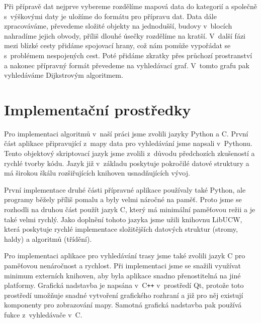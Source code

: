 Při přípravě dat nejprve vybereme rozdělíme mapová data do kategorií a společně
s~výškovými daty je uložíme do formátu pro přípravu dat. Data dále zpracováváme,
převedeme složité objekty na jednodušší, budovy v~blocích nahradíme jejich
obvody, příliš dlouhé úsečky rozdělíme na kratší. V~další fázi mezi blízké cesty
přidáme spojovací hrany, což nám pomůže vypořádat se s~problémem nespojených
cest. Poté přidáme zkratky přes průchozí prostranství a nakonec přípravný formát
převedeme na vyhledávací graf. V~tomto grafu pak vyhledáváme Dijkstrovým
algoritmem.

%

\section{Implementační prostředky}
Pro implementaci algoritmů v~naší práci jsme zvolili jazyky Python a C. První část
aplikace připravující z~mapy data pro vyhledávání jsme napsali v~Pythonu. Tento
objektový skriptovací jazyk jsme zvolili z~důvodu předchozích zkušeností a
rychlé tvorby kódu. Jazyk již v~základu poskytuje pokročilé datové struktury a
má širokou škálu rozšiřujících knihoven usnadňujících vývoj. 

První implementace druhé části přípravné aplikace používaly také Python, ale programy
běžely příliš pomalu a byly velmi náročné na paměť. Proto jsme se rozhodli na
druhou část použít jazyk C, který má minimální paměťovou režii a je také velmi
rychlý. Jako doplnění tohoto jazyka jsme užili knihovnu LibUCW, která poskytuje
rychlé implementace složitějších datových struktur (stromy, haldy) a algoritmů
(třídění). 

Pro implementaci aplikace pro vyhledávání trasy jsme také zvolili jazyk C pro
paměťovou nenáročnost a rychlost. Při implementaci jsme se snažili využívat
minimum externích knihoven, aby byla aplikace snadno přenostitelná na jiné
platformy. Grafická nadstavba je napsána v~C{\tt++} v~prostředí Qt, protože toto
prostředí umožňuje snadné vytvoření grafického rozhraní a již pro něj existují
komponenty pro zobrazování mapy. Samotná grafická nadstavba pak používá fukce
z~vyhledávače v~C.


